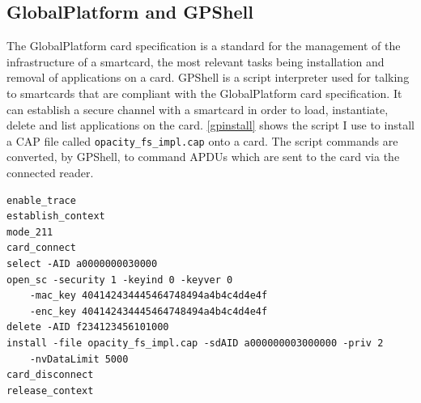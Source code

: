 \documentclass[12pt,a4paper,twoside,openright]{report}
\begin{document}
\subsection{GlobalPlatform and GPShell}

The GlobalPlatform card specification is a standard for the management of the infrastructure of a smartcard, the most relevant tasks being installation and removal of applications on a card. GPShell \cite{gpshell} is a script interpreter used for talking to smartcards that are compliant with the GlobalPlatform card specification. It can establish a secure channel with a smartcard in order to load, instantiate, delete and list applications on the card. \autoref{gpinstall} shows the script I use to install a CAP file called \texttt{opacity\_fs\_impl.cap} onto a card. The script commands are converted, by GPShell, to command APDUs which are sent to the card via the connected reader.

\begin{lstlisting}[caption={Applet install script},captionpos=b,label={gpinstall}]
enable_trace
establish_context
mode_211
card_connect
select -AID a0000000030000
open_sc -security 1 -keyind 0 -keyver 0
    -mac_key 404142434445464748494a4b4c4d4e4f
    -enc_key 404142434445464748494a4b4c4d4e4f
delete -AID f234123456101000
install -file opacity_fs_impl.cap -sdAID a000000003000000 -priv 2
    -nvDataLimit 5000
card_disconnect
release_context
\end{lstlisting}
\end{document}

